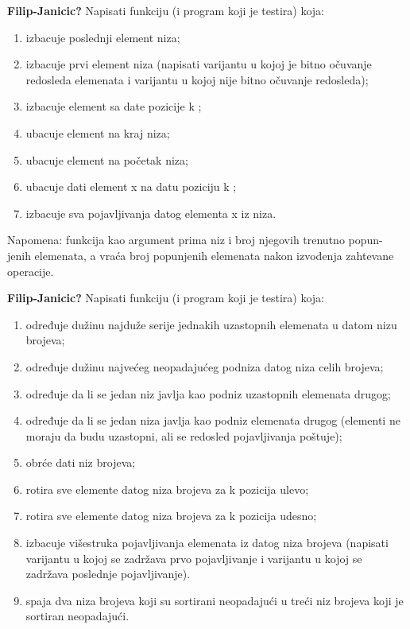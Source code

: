 \begin{Exercise}[label=p2.1_] 
\textbf{Filip-Janicic?} Napisati funkciju (i program koji je testira)
koja: 
\begin{enumerate}
\item  izbacuje poslednji element niza; 
\item izbacuje prvi element niza (napisati varijantu u kojoj je bitno
  očuvanje redosleda elemenata i varijantu u kojoj nije bitno očuvanje
  redosleda); 
\item izbacuje element sa date pozicije k ; 
\item ubacuje element na kraj niza; 
\item ubacuje element na početak niza; 
\item ubacuje dati element x na datu poziciju k ; 
\item izbacuje sva pojavljivanja datog elementa x iz niza. 
\end{enumerate}
 Napomena: funkcija kao argument prima niz i broj njegovih trenutno
 popun- jenih elemenata, a vraća broj popunjenih elemenata nakon
 izvođenja zahtevane operacije.  \\
\end{Exercise}
\begin{Answer}[ref=p2.1_]
\end{Answer}

\begin{Exercise}[label=p2.1_] 
\textbf{Filip-Janicic?} Napisati funkciju (i program koji je testira)
koja: 
\begin{enumerate}
\item  određuje dužinu najduže serije jednakih uzastopnih elemenata
u datom nizu brojeva; 
\item određuje dužinu najvećeg neopadajućeg podniza datog niza celih
  brojeva; 
\item određuje da li se jedan niz javlja kao podniz uzastopnih
  elemenata drugog; 
\item određuje da li se jedan niza javlja kao podniz elemenata drugog
  (elementi ne moraju da budu uzastopni, ali se redosled pojavljivanja
  poštuje); 
\item obrće dati niz brojeva; 
\item rotira sve elemente datog niza brojeva za k pozicija ulevo; 
\item rotira sve elemente datog niza brojeva za k pozicija udesno; 
\item izbacuje višestruka pojavljivanja elemenata iz datog niza
  brojeva (napisati varijantu u kojoj se zadržava prvo pojavljivanje i
  varijantu u kojoj se zadržava poslednje pojavljivanje).  
\item spaja dva niza brojeva koji su sortirani neopadajući u treći niz
  brojeva koji je sortiran neopadajući.  
\end{enumerate}
\end{Exercise}
\begin{Answer}[ref=p2.1_]
\end{Answer}

